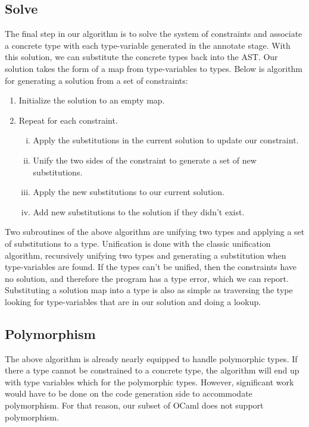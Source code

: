 \documentclass[12pt,a4paper,twoside,openright]{report}
\begin{document}
\subsection{Solve}
The final step in our algorithm is to solve the system of constraints and associate a concrete type with each type-variable generated in the annotate stage.
With this solution, we can substitute the concrete types back into the AST.
Our solution takes the form of a map from type-variables to types.
Below is algorithm for generating a solution from a set of constraints:
\begin{enumerate}
   \item Initialize the solution to an empty map.
   \item Repeat for each constraint.
      \begin{enumerate}[i.]
         \item Apply the substitutions in the current solution to update our constraint.
         \item Unify the two sides of the constraint to generate a set of new substitutions.
         \item Apply the new substitutions to our current solution.
         \item Add new substitutions to the solution if they didn't exist.
      \end{enumerate}
\end{enumerate}
Two subroutines of the above algorithm are unifying two types and applying a set of substitutions to a type.
Unification is done with the classic unification algorithm, recursively unifying two types and generating a substitution when type-variables are found.
If the types can't be unified, then the constraints have no solution, and therefore the program has a type error, which we can report.
Substituting a solution map into a type is also as simple as traversing the type looking for type-variables that are in our solution and doing a lookup.

\subsection{Polymorphism}
The above algorithm is already nearly equipped to handle polymorphic types.
If there a type cannot be constrained to a concrete type, the algorithm will end up with type variables which for the polymorphic types.
However, significant work would have to be done on the code generation side to accommodate polymorphism.
For that reason, our subset of OCaml does not support polymorphism.
\end{document}
